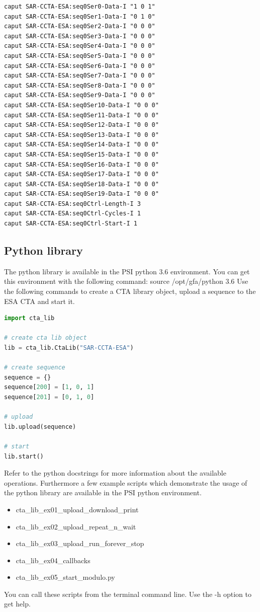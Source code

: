 \documentclass[12pt,a4paper]{article}
\begin{document}
\begin{minipage}{\linewidth}
\begin{lstlisting}[caption={caput listing}, label={lst:caput}, linewidth=\columnwidth]
caput SAR-CCTA-ESA:seq0Ser0-Data-I "1 0 1"
caput SAR-CCTA-ESA:seq0Ser1-Data-I "0 1 0"
caput SAR-CCTA-ESA:seq0Ser2-Data-I "0 0 0"
caput SAR-CCTA-ESA:seq0Ser3-Data-I "0 0 0"
caput SAR-CCTA-ESA:seq0Ser4-Data-I "0 0 0"
caput SAR-CCTA-ESA:seq0Ser5-Data-I "0 0 0"
caput SAR-CCTA-ESA:seq0Ser6-Data-I "0 0 0"
caput SAR-CCTA-ESA:seq0Ser7-Data-I "0 0 0"
caput SAR-CCTA-ESA:seq0Ser8-Data-I "0 0 0"
caput SAR-CCTA-ESA:seq0Ser9-Data-I "0 0 0"
caput SAR-CCTA-ESA:seq0Ser10-Data-I "0 0 0"
caput SAR-CCTA-ESA:seq0Ser11-Data-I "0 0 0"
caput SAR-CCTA-ESA:seq0Ser12-Data-I "0 0 0"
caput SAR-CCTA-ESA:seq0Ser13-Data-I "0 0 0"
caput SAR-CCTA-ESA:seq0Ser14-Data-I "0 0 0"
caput SAR-CCTA-ESA:seq0Ser15-Data-I "0 0 0"
caput SAR-CCTA-ESA:seq0Ser16-Data-I "0 0 0"
caput SAR-CCTA-ESA:seq0Ser17-Data-I "0 0 0"
caput SAR-CCTA-ESA:seq0Ser18-Data-I "0 0 0"
caput SAR-CCTA-ESA:seq0Ser19-Data-I "0 0 0"
caput SAR-CCTA-ESA:seq0Ctrl-Length-I 3
caput SAR-CCTA-ESA:seq0Ctrl-Cycles-I 1
caput SAR-CCTA-ESA:seq0Ctrl-Start-I 1
\end{lstlisting}
\end{minipage}

\subsection{Python library}
The python library is available in the PSI python 3.6 environment. You can get
this environment with the following command: source /opt/gfa/python 3.6
Use the following commands to create a CTA library object, upload a sequence
to the ESA CTA and start it.

\begin{lstlisting}[caption={python CTA lib}, label={lst:python_cta_lib}, language=Python]
import cta_lib

# create cta lib object
lib = cta_lib.CtaLib("SAR-CCTA-ESA")

# create sequence
sequence = {}
sequence[200] = [1, 0, 1]
sequence[201] = [0, 1, 0]

# upload
lib.upload(sequence)

# start
lib.start()
\end{lstlisting}

Refer to the python docstrings for more information about the available
operations.
Furthermore a few example scripts which demonstrate the usage of the python
library are available in the PSI python environment.
\begin{itemize}
\item
cta\_lib\_ex01\_upload\_download\_print
\item
cta\_lib\_ex02\_upload\_repeat\_n\_wait
\item
cta\_lib\_ex03\_upload\_run\_forever\_stop
\item
cta\_lib\_ex04\_callbacks
\item
cta\_lib\_ex05\_start\_modulo.py
\end{itemize}
You can call these scripts from the terminal command line. Use the -h option to get help.
\end{document}
